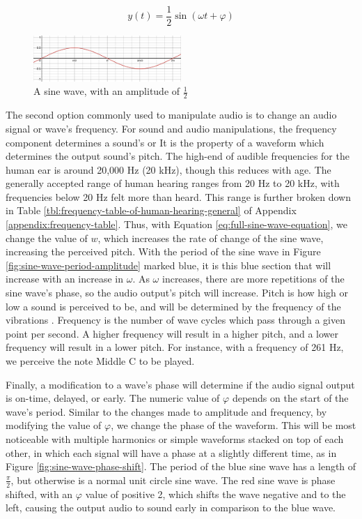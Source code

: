\begin{equation}\label{eq:half-sized-sine-wave}
	y(t) = \frac{1}{2} \sin(\omega t + \varphi)
\end{equation}

\begin{figure}[ht]
	\centering
	\includegraphics[width=0.5\textwidth]{figures/half-sized-sine-wave.png}
	\caption{A sine wave, with an amplitude of $\frac{1}{2}$}
	\label{fig:half-sized-sine-wave}
\end{figure}

The second option commonly used to manipulate audio is to change an audio signal or wave's frequency. For sound and audio manipulations, the frequency component determines a sound's  or  It is the property of a waveform which determines the output sound's pitch. The high-end of audible frequencies for the human ear is around 20,000 Hz (20 kHz), though this reduces with age. The generally accepted range of human hearing ranges from 20 Hz to 20 kHz, with frequencies below 20 Hz felt more than heard\cite{Rosen_Howell_2011}. This range is further broken down in Table \ref{tbl:frequency-table-of-human-hearing-general} of Appendix \ref{appendix:frequency-table}. Thus, with Equation \ref{eq:full-sine-wave-equation}, we change the value of $w$, which increases the rate of change of the sine wave, increasing the perceived pitch. With the period of the sine wave in Figure \ref{fig:sine-wave-period-amplitude} marked blue, it is this blue section that will increase with an increase in $\omega$. As $\omega$ increases, there are more repetitions of the sine wave's phase, so the audio output's pitch will increase. Pitch is how high or low a sound is perceived to be, and will be determined by the frequency of the vibrations \cite{Toft_2020}. Frequency is the number of wave cycles which pass through a given point per second. A higher frequency will result in a higher pitch, and a lower frequency will result in a lower pitch. For instance, with a frequency of 261 Hz, we perceive the note Middle C to be played. 

Finally, a modification to a wave's phase will determine if the audio signal output is on-time, delayed, or early. The numeric value of $\varphi$ depends on the start of the wave's period. Similar to the changes made to amplitude and frequency, by modifying the value of $\varphi$, we change the phase of the waveform. This will be most noticeable with multiple harmonics or simple waveforms stacked on top of each other, in which each signal will have a phase at a slightly different time, as in Figure \ref{fig:sine-wave-phase-shift}. The period of the blue sine wave has a length of $\frac{\pi}{2}$, but otherwise is a normal unit circle sine wave. The red sine wave is phase shifted, with an $\varphi$ value of positive 2, which shifts the wave negative and to the left, causing the output audio to sound early in comparison to the blue wave. 

